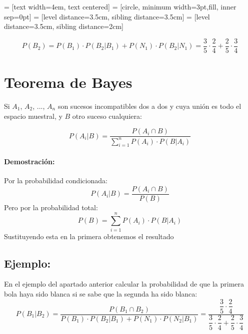  = [text width=4em, text centered]
 = [circle, minimum width=3pt,fill, inner sep=0pt]
 = [level distance=3.5cm, sibling distance=3.5cm]
 = [level distance=3.5cm, sibling distance=2cm]
$$P(B_2)=P(B_1)\cdot P(B_2|B_1) + P(N_1)\cdot P(B_2|N_1)
= \frac{3}{5}\cdot\frac{2}{4} + \frac{2}{5}\cdot\frac{3}{4}$$

\section{Teorema de Bayes}

Si $A_1$, $A_2$, ..., $A_n$   son sucesos incompatibles dos a dos y cuya unión es todo el espacio muestral, y $B$ otro suceso cualquiera:

$$P(A_i|B)=\dfrac{P(A_i \cap B)}{\sum_{i=1}^n P(A_i)\cdot  P(B|A_i)} $$

\paragraph{Demostración:} Por la probabilidad condicionada:
$$P(A_i|B)=\dfrac{P(A_i \cap B)}{P(B)} $$
Pero por la probabilidad total:
$$P(B)=\sum_{i=1}^n P(A_i)\cdot  P(B|A_i)$$
Sustituyendo esta en la primera obtenemos el resultado
\subsection{Ejemplo:} En el ejemplo del apartado anterior calcular la probabilidad de que la primera bola haya sido blanca si se sabe que la segunda ha sido blanca:
$$P(B_1|B_2)=\dfrac{P(B_1 \cap B_2)}{P(B_1)\cdot  P(B_2|B_1)+P(N_1)\cdot  P(N_2|B_1)}=\dfrac{\dfrac{3}{5}\cdot\dfrac{2}{4}}{\dfrac{3}{5}\cdot\dfrac{2}{4} + \dfrac{2}{5}\cdot\dfrac{3}{4}}$$




